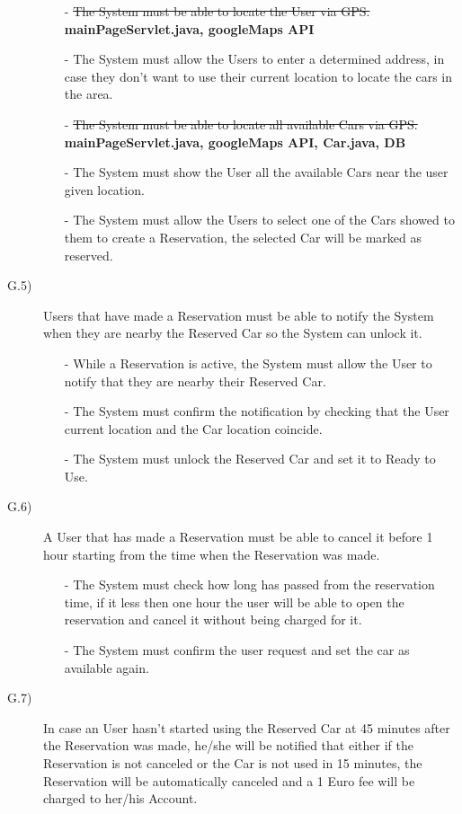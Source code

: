 \documentclass[a4paper]{article}
\begin{document}
\begin{description}
\begin{itemize}
	\item[-]\sout{The System must be able to locate the User via GPS.}
	\textbf{mainPageServlet.java, googleMaps API}
	\item[-]The System must allow the Users to enter a determined address, in case they don't want to use their current location to locate the cars in the area.
	\item[-]\sout{The System must be able to locate all available Cars via GPS.}
	\textbf{mainPageServlet.java, googleMaps API, Car.java, DB}
	\item[-]The System must show the User all the available Cars near the user given location.
	\item[-]The System must allow the Users to select one of the Cars showed to them to create a Reservation, the selected Car will be marked as reserved.
\end{itemize}
\item [G.5)]Users that have made a Reservation must be able to notify the System when they are nearby the Reserved Car so the System can unlock it.
\begin{itemize}
	\item[-]While a Reservation is active, the System must allow the User to notify that they are nearby their Reserved Car.
	\item[-]The System must confirm the notification by checking that the User current location and the Car location coincide.
	\item[-]The System must unlock the Reserved Car and set it to Ready to Use.
\end{itemize}
\item [G.6)]A User that has made a Reservation must be able to cancel it before 1 hour starting from the time when the Reservation was made.
\begin{itemize}
	\item[-]The System must check how long has passed from the reservation time, if it less then one hour the user will be able to open the reservation and cancel it without being charged for it.
	\item[-]The System must confirm the user request and set the car as available again.
\end{itemize}
\item [G.7)]In case an User hasn't started using the Reserved Car at 45 minutes after the Reservation was made, he/she will be notified that either if the Reservation is not canceled or the Car is not used in 15 minutes, the Reservation will be automatically canceled and a 1 Euro fee will be charged to her/his Account.

\end{description}
\end{document}
